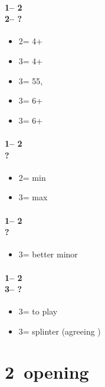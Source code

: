\documentclass[12pt, a4paper]{report}
\begin{document}
{{        \subsubsection*{1\nt -- 2\hearts\\
                        2\spades -- ?}
        \begin{itemize}
            \item 2\nt = 4+\clubs\ \gf
            \item 3\clubs = 4+\diams\ \gf
            \item 3\diams = 55\major, \inv
            \item 3\hearts = 6+\spades\ \gf
            \item 3\spades = 6+\spades\ \inv
        \end{itemize}

        \subsubsection*{1\nt -- 2\spades\\
                        ?}
        \begin{itemize}
            \item 2\nt = min
            \item 3\clubs = max
        \end{itemize}

        \subsubsection*{1\nt -- 2\nt\\
                        ?}
        \begin{itemize}
            \item 3\minor = better minor
        \end{itemize}

        \subsubsection*{1\nt -- 2\nt\\
                        3\minor -- ?}
        \begin{itemize}
            \item 3\diams = to play
            \item 3\major = splinter (agreeing \diams)
        \end{itemize}
    }

    \chapter*{\colorbox{Plum!30}{2\ntch\ opening}}
     {
        
}}
\end{document}
